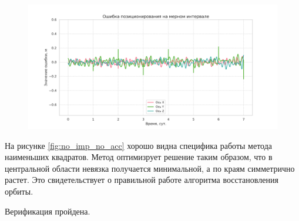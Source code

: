 \begin{figure}[h!]
   \centering
   \includegraphics[width=\linewidth]{../images/solution/lageos/with_imp_with_acc.png}
   \label{fig:with_imp_with_acc}
\end{figure}

На рисунке \ref{fig:no_imp_no_acc} хорошо видна специфика работы метода наименьших квадратов.
Метод оптимизрует решение таким образом, что в центральной области невязка получается
минимальной, а по краям симметрично растет. Это свидетельствует о правильной работе
алгоритма восстановления орбиты.

Верификация пройдена.